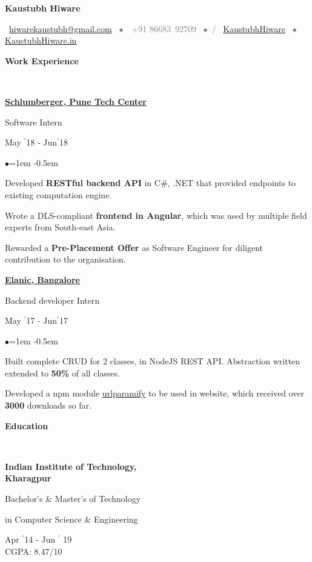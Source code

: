 \documentclass[11pt, a4paper]{resume}
\newcommand{\important}[1]{
	\textcolor{mypurple}{#1}
}
\newcommand{\greyed}[1]{
	\textcolor{gray}{#1}
}
\newcommand{\titleX}[1]{
	\begin{LARGE}
    	\important{\centerline{\textbf{#1}}}
    \end{LARGE}
}
\newcommand{\fillit}[1]{
	\leavevmode\xleaders\hbox{#1}\hfill\kern0pt
}
\newcommand{\sectionTitle}[1]{
	\begin{Large}
    	\important{\textbf{#1}} 
    \end{Large}
    \important{\rlap{\rule[.5ex]{\linegoal}{0.5pt}}{}}
     \vspace{0.1em}\\
}
\newcommand{\textbox}[1]{
  \parbox{.333\textwidth}{#1}
}
\newenvironment{Jobsection}[3]{ %
\noindent\textbox{\bf #1\hfill}\textbox{\hfil #2\hfil}\textbox{\hfill #3}
  \begin{list}{$\bullet$}{\leftmargin=1em} %
   \itemsep -0.5em \vspace{-0.5em} %
  }{
  \end{list}
  \vspace{0.2em} %
}
\newcommand{\education}[3]{ %
\noindent\parbox{.3\textwidth}{\bf #1\hfill}\parbox{.45\textwidth}{\hfil #2\hfil}\parbox{.25\textwidth}{\hfill #3}
}
\begin{document}
\titleX{Kaustubh Hiware}
\normalsize
\vspace{6pt}
\greyed{\centerline{\faEnvelopeO \, \href{mailto:hiwarekaustubh@gmail.com}{ hiwarekaustubh@gmail.com} \, $\bullet$ \,\faMobile\, +91 86683\, 92709 \, $\bullet$ \,\faGithub / \faLinkedin \, \href{https://github.com/kaustubhhiware}{KaustubhHiware} \,  $\bullet$ \, \faGlobe \, \href{https://kaustubhhiware.in}{KaustubhHiware.in}}}

\vspace{-2em}
\sectionTitle{Work Experience}
\begin{Jobsection}{\href{https://drive.google.com/file/d/1EcfIC_g8bx3whaxMdOkFyZx4TCqA1RAq/view?usp=sharing}{Schlumberger, Pune Tech Center}}{Software Intern}{ May $^{\prime}$18 - Jun$^{\prime}$18}
\item Developed {\bf RESTful backend API} in C\#, .NET that provided endpoints to existing computation engine.
\item Wrote a DLS-compliant {\bf frontend in Angular}, which was used by multiple field experts from South-east Asia.
\item Rewarded a {\bf Pre-Placement Offer} as Software Engineer for diligent contribution to the organisation.
\end{Jobsection}

\begin{Jobsection}{\href{https://drive.google.com/file/d/0B5iU6cWw36rOVWZIcllPY3RSd2c/view?usp=sharing}{Elanic, Bangalore}}{Backend developer Intern}{ May $^{\prime}$17 - Jun$^{\prime}$17}
\item Built complete CRUD for 2 classes, in NodeJS REST API. Abstraction written extended to {\bf 50\%} of all classes.
\item Developed a npm module \href{https://www.npmjs.com/package/urlparamify}{urlparamify} to be used in website, which received over {\bf 3000} downloads so far.
\end{Jobsection}

\sectionTitle{Education\vspace{0.5em}}
\education{Indian Institute of Technology,\\ Kharagpur}{\centerline{Bachelor's \& Master's of Technology} \centerline{in Computer Science \& Engineering}}{Apr $^{\prime}$14 - Jun $^{\prime}$ 19 \\\hspace*{\fill} CGPA: 8.47/10}
\end{document}
